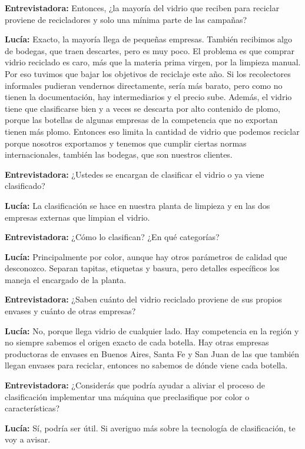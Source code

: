 \textbf{Entrevistadora:} Entonces, ¿la mayoría del vidrio que reciben para reciclar proviene de recicladores y solo una mínima parte de las campañas?

\textbf{Lucía:} Exacto, la mayoría llega de pequeñas empresas. También recibimos algo de bodegas, que traen descartes, pero es muy poco. El problema es que comprar vidrio reciclado es caro, más que la materia prima virgen, por la limpieza manual. Por eso tuvimos que bajar los objetivos de reciclaje este año. Si los recolectores informales pudieran vendernos directamente, sería más barato, pero como no tienen la documentación, hay intermediarios y el precio sube. Además, el vidrio tiene que clasificarse bien y a veces se descarta por alto contenido de plomo, porque las botellas de algunas empresas de la competencia que no exportan tienen más plomo. Entonces eso limita la cantidad de vidrio que podemos reciclar porque nosotros exportamos y tenemos que cumplir ciertas normas internacionales, también las bodegas, que son nuestros clientes.

\textbf{Entrevistadora:} ¿Ustedes se encargan de clasificar el vidrio o ya viene clasificado?

\textbf{Lucía:} La clasificación se hace en nuestra planta de limpieza y en las dos empresas externas que limpian el vidrio.

\textbf{Entrevistadora:} ¿Cómo lo clasifican? ¿En qué categorías?

\textbf{Lucía:} Principalmente por color, aunque hay otros parámetros de calidad que desconozco. Separan tapitas, etiquetas y basura, pero detalles específicos los maneja el encargado de la planta.

\textbf{Entrevistadora:} ¿Saben cuánto del vidrio reciclado proviene de sus propios envases y cuánto de otras empresas?

\textbf{Lucía:} No, porque llega vidrio de cualquier lado. Hay competencia en la región y no siempre sabemos el origen exacto de cada botella. Hay otras empresas productoras de envases en Buenos Aires, Santa Fe y San Juan de las que también llegan envases para reciclar, entonces no sabemos de dónde viene cada botella.

\textbf{Entrevistadora:} ¿Considerás que podría ayudar a aliviar el proceso de clasificación implementar una máquina que preclasifique por color o características?

\textbf{Lucía:} Sí, podría ser útil. Si averiguo más sobre la tecnología de clasificación, te voy a avisar.

